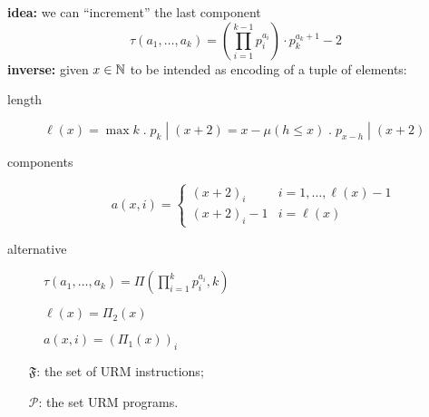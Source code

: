 \textbf{idea:} we can ``increment'' the last component
$$\tau(a_1, \dots, a_k) = (\prod_{i=1}^{k-1}p_i^{a_i}) \cdot p_k^{a_k+1} - 2$$
\textbf{inverse:} given $x \in \mathbb{N}$ to be intended as encoding of a
tuple of elements:

\begin{description}
\item[length]
  $\ell(x) = \max k \; . \; p_k \; | \; (x+2) = x - \mu (h \leq x) \;
  . \; p_{x-h} \; | \;(x+2)$
\item[components] \[a(x,i) = \begin{cases}
      (x+2)_i & i = 1, \dots, \ell(x)-1 \\
      (x+2)_i - 1 & i = \ell(x)
    \end{cases}\]
\item[alternative]{
    $\tau(a_1, \dots, a_k) = \Pi(\prod_{i=1}^k p_i^{a_i}, k)$

    $\ell(x) = \Pi_2(x)$

    $a(x,i) = (\Pi_1(x))_i$
  }
\end{description}

\begin{notation}
  \begin{itemize}
  \item[$\mathfrak{F}$:] the set of URM instructions;
    \item[$\mathcal{P}$:] the set URM programs.
  \end{itemize}
\end{notation}

